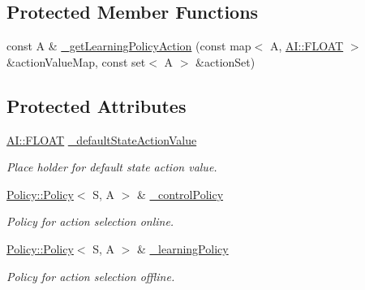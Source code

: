 \subsection*{Protected Member Functions}
\begin{DoxyCompactItemize}
\item 
const A \& \hyperlink{classAI_1_1Algorithm_1_1LearningAlgorithm_ad5b5f6baa9c03f68427008abeeb35535}{\-\_\-get\-Learning\-Policy\-Action} (const map$<$ A, \hyperlink{namespaceAI_a41b74884a20833db653dded3918e05c3}{A\-I\-::\-F\-L\-O\-A\-T} $>$ \&action\-Value\-Map, const set$<$ A $>$ \&action\-Set)
\end{DoxyCompactItemize}
\subsection*{Protected Attributes}
\begin{DoxyCompactItemize}
\item 
\hypertarget{classAI_1_1Algorithm_1_1LearningAlgorithm_ae3b8ccdc51ad2a8c1cc2ef9009258466}{\hyperlink{namespaceAI_a41b74884a20833db653dded3918e05c3}{A\-I\-::\-F\-L\-O\-A\-T} \hyperlink{classAI_1_1Algorithm_1_1LearningAlgorithm_ae3b8ccdc51ad2a8c1cc2ef9009258466}{\-\_\-default\-State\-Action\-Value}}\label{classAI_1_1Algorithm_1_1LearningAlgorithm_ae3b8ccdc51ad2a8c1cc2ef9009258466}

\begin{DoxyCompactList}\small\item\em Place holder for default state action value. \end{DoxyCompactList}\item 
\hypertarget{classAI_1_1Algorithm_1_1LearningAlgorithm_ad74dbed6a7be0c699d42642b9968bf86}{\hyperlink{classAI_1_1Algorithm_1_1Policy_1_1Policy}{Policy\-::\-Policy}$<$ S, A $>$ \& \hyperlink{classAI_1_1Algorithm_1_1LearningAlgorithm_ad74dbed6a7be0c699d42642b9968bf86}{\-\_\-control\-Policy}}\label{classAI_1_1Algorithm_1_1LearningAlgorithm_ad74dbed6a7be0c699d42642b9968bf86}

\begin{DoxyCompactList}\small\item\em Policy for action selection online. \end{DoxyCompactList}\item 
\hypertarget{classAI_1_1Algorithm_1_1LearningAlgorithm_a603f2a2905636a150c0fb9946085837a}{\hyperlink{classAI_1_1Algorithm_1_1Policy_1_1Policy}{Policy\-::\-Policy}$<$ S, A $>$ \& \hyperlink{classAI_1_1Algorithm_1_1LearningAlgorithm_a603f2a2905636a150c0fb9946085837a}{\-\_\-learning\-Policy}}\label{classAI_1_1Algorithm_1_1LearningAlgorithm_a603f2a2905636a150c0fb9946085837a}

\begin{DoxyCompactList}\small\item\em Policy for action selection offline. \end{DoxyCompactList}\end{DoxyCompactItemize}
